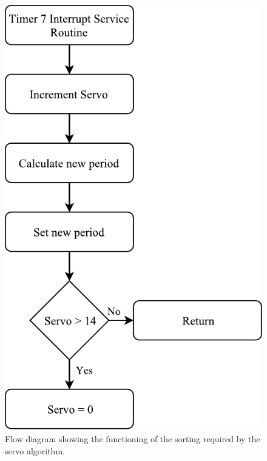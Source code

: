 \begin{figure}[H]
\centering
\includegraphics[scale = 1]{pics/Soft7.pdf}
\caption{Flow diagram showing the functioning of the sorting required by the servo algorithm.}
\label{fig:Soft7}
\end{figure}

